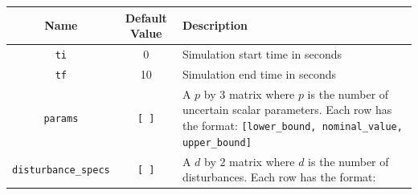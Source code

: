 \documentclass{article}
\begin{document}
\begin{table}[H]
\begin{center}
\begin{tabular}{| c | c | p{9cm} |}
\hline
\textbf{Name} & \textbf{Default Value} & \textbf{Description} \\
\hline
\texttt{ti} & 0 & Simulation start time in seconds \\
\hline 
\texttt{tf} & 10 & Simulation end time in seconds \\
\hline
\texttt{params} & \texttt{[ ]} & A $p$ by 3 matrix where $p$ is the number of
uncertain scalar parameters. Each row has the format:
\texttt{[lower\_bound, nominal\_value, upper\_bound]}\\
\hline
\texttt{disturbance\_specs} & \texttt{[ ]} & A $d$ by 2 matrix where $d$ is the
number of disturbances. Each row has the format:


\end{tabular}
\end{center}
\end{table}
\end{document}
